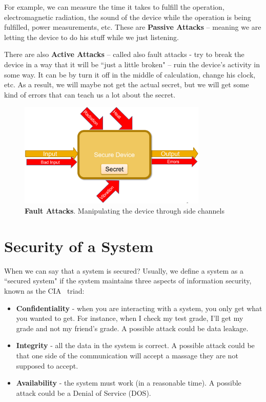 For example, we can measure the time it takes to fulfill the operation, electromagnetic radiation, the sound of the device while the operation is being fulfilled, power measurements, etc. These are \textbf{Passive Attacks} – meaning we are letting the device to do his stuff while we just listening.

There are also \textbf{Active Attacks} – called also fault attacks -  try to break the device in a way that it will be ``just a little broken" – ruin the device's activity in some way. It can be by turn it off in the middle of calculation, change his clock, etc. As a result, we will maybe not get the actual secret, but we will get some kind of errors that can teach us a lot about the secret. 

\begin{figure}[!ht]
    \centering
    \includegraphics[width=0.8\textwidth]{images/ch1_Intro/Secure_device3.png}
    \caption{\textbf{Fault Attacks}. Manipulating the device through side channels}
    \label{fig:SecDev3}
\end{figure}

\section{Security of a System} \label{sec:SystemSecurity}

When we can say that a system is secured?
Usually, we define a system as a ``secured system" if the system maintains three aspects of information security, known as the CIA~\cite{cia} triad:

\begin{itemize}
    \item \textbf{Confidentiality} - when you are interacting with a system, you only get what you wanted to get. For instance, when I check my test grade, I'll get my grade and not my friend's grade. A possible attack could be data leakage.
    \item \textbf{Integrity} - all the data in the system is correct. A possible attack could be that one side of the communication will accept a massage they are not supposed to accept.
    \item \textbf{Availability} - the system must work (in a reasonable time). A possible attack could be a Denial of Service (DOS).
\end{itemize}

